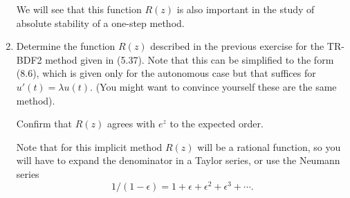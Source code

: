 \documentclass[10pt]{amsart}
\begin{document}
\begin{enumerate}[label={\bf Problem~{\arabic*}:}]
We will see that this function $R(z)$ is also important in the study of 
absolute stability of a one-step method.




\mline
\item

Determine the function $R(z)$ described in the previous exercise for the
TR-BDF2 method given in (5.37).  Note that this can be simplified to the
form (8.6), which is given only for the autonomous case but that suffices
for $u'(t) = \lambda u(t)$.  (You might want to convince yourself these are 
the same method).

Confirm that $R(z)$ agrees with $e^z$ to the expected order.

Note that for this implicit method $R(z)$ will be a rational function, so you
will have to expand the denominator in a Taylor series, or use the Neumann
series 
\[
1/(1-\epsilon) = 1 + \epsilon + \epsilon^2 + \epsilon^3 + \cdots.
\]



  
  \end{enumerate}
\end{document}
